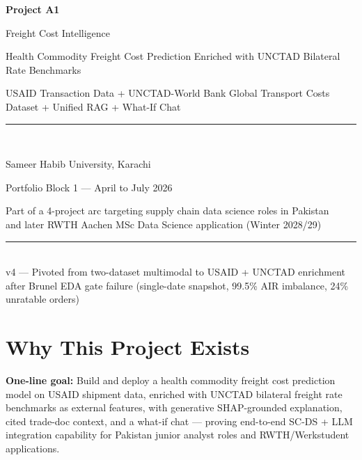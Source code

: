 \documentclass[11pt, a4paper]{article}
\begin{document}
\begin{titlepage}
  \centering
  \vspace*{2cm}
  {\huge\bfseries\color{accent} Project A1\par}
  \vspace{0.5cm}
  {\LARGE Freight Cost Intelligence\par}
  \vspace{0.3cm}
  {\large Health Commodity Freight Cost Prediction Enriched with UNCTAD Bilateral Rate Benchmarks\par}
  \vspace{0.2cm}
  {\normalsize USAID Transaction Data + UNCTAD-World Bank Global Transport Costs Dataset + Unified RAG + What-If Chat\par}
  \vspace{2cm}
  \rule{0.6\textwidth}{0.4pt}\\[1em]
  {\large Sameer \textbar{} Habib University, Karachi\par}
  {\large Portfolio Block 1 --- April to July 2026\par}
  \vspace{1cm}
  {\normalsize Part of a 4-project arc targeting supply chain data science roles in Pakistan\\
  and later RWTH Aachen MSc Data Science application (Winter 2028/29)\par}
  \vspace{2cm}
  \rule{0.6\textwidth}{0.4pt}\\[1em]
  {\small\color{gray} v4 --- Pivoted from two-dataset multimodal to USAID + UNCTAD enrichment after Brunel EDA gate failure (single-date snapshot, 99.5\% AIR imbalance, 24\% unratable orders)}
\end{titlepage}

\tableofcontents
\newpage

\section{Why This Project Exists}

\begin{infobox}
\textbf{One-line goal:} Build and deploy a health commodity freight cost prediction model on USAID shipment data, enriched with UNCTAD bilateral freight rate benchmarks as external features, with generative SHAP-grounded explanation, cited trade-doc context, and a what-if chat --- proving end-to-end SC-DS + LLM integration capability for Pakistan junior analyst roles and RWTH/Werkstudent applications.
\end{infobox}
\end{document}
